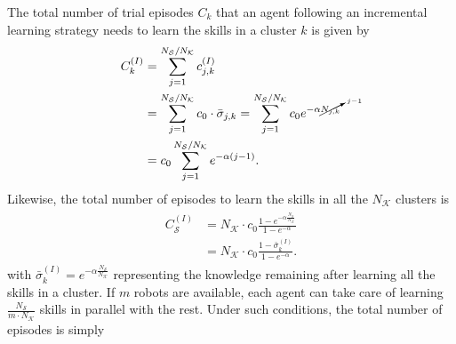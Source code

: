 The total number of trial episodes $ C_k $ that an agent following an incremental learning strategy needs to learn the skills in a cluster $ k $ is given by
\begin{align}
	\begin{split}
		C^{(I)}_k &= \sum^{N_\mathcal{S}/N_\mathcal{K}}_{j=1} c^{(I)}_{j,k}  \\
		&= \sum^{N_\mathcal{S}/N_\mathcal{K}}_{j=1} c_0 \cdot  \bar{\sigma}_{j,k}  = \sum^{N_\mathcal{S}/N_\mathcal{K}}_{j=1} c_0 e^{-\alpha {\cancelto{j-1}{N_{j,k}}}}\\
		&= c_0 \sum^{N_\mathcal{S}/N_\mathcal{K}}_{j=1} e^{-\alpha (j-1)}.
	\end{split}
\end{align}
Likewise, the total number of episodes to learn the skills in all the $ N_\mathcal{K} $ clusters is
%
\begin{align}\label{eq:complexity_incremental_single}
	\begin{split}
		C_\mathcal{S}^{(I)} &= N_\mathcal{K} \cdot c_0 \frac{1 - e^{-\alpha \frac{N_\mathcal{S}}{N_\mathcal{K}}}}{1 - e^{-\alpha}}\\ 
		&= N_\mathcal{K} \cdot c_0 \frac{1 - \bar{\sigma}_k^{(I)}}{1 - e^{-\alpha}}.
	\end{split}
\end{align}
with $ \bar{\sigma}^{(I)}_k = e^{-\alpha \frac{N_\mathcal{S}}{N_\mathcal{K}}} $ representing the knowledge remaining after learning all the skills in a cluster. If $ m $ robots are available, each agent can take care of learning $ \frac{N_\mathcal{S}}{m \cdot N_\mathcal{K}} $ skills in parallel with the rest. Under such conditions, the total number of episodes is simply

